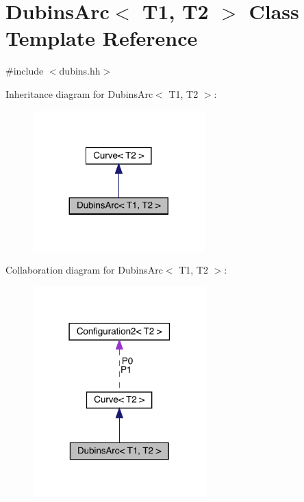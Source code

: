 \hypertarget{class_dubins_arc}{}\section{Dubins\+Arc$<$ T1, T2 $>$ Class Template Reference}
\label{class_dubins_arc}


{\ttfamily \#include $<$dubins.\+hh$>$}



Inheritance diagram for Dubins\+Arc$<$ T1, T2 $>$\+:
\nopagebreak
\begin{figure}[H]
\begin{center}
\leavevmode
\includegraphics[width=188pt]{class_dubins_arc__inherit__graph}
\end{center}
\end{figure}


Collaboration diagram for Dubins\+Arc$<$ T1, T2 $>$\+:
\nopagebreak
\begin{figure}[H]
\begin{center}
\leavevmode
\includegraphics[width=190pt]{class_dubins_arc__coll__graph}
\end{center}
\end{figure}
